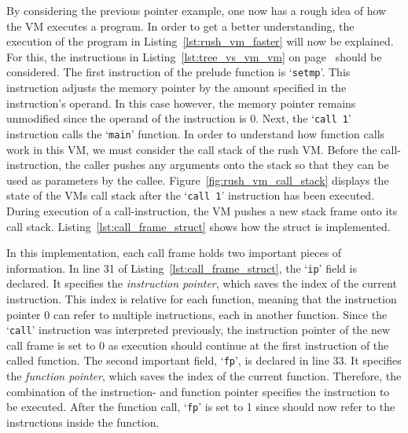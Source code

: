 By considering the previous pointer example, one now has a rough idea of how the VM executes a program.
In order to get a better understanding, the execution of the program in Listing~\ref{lst:rush_vm_faster} will now be explained.
For this, the instructions in Listing~\ref{lst:tree_vs_vm_vm} on page~\pageref{lst:tree_vs_vm_vm} should be considered.
The first instruction of the prelude function is `\texttt{setmp}'.
This instruction adjusts the memory pointer by the amount specified in the instruction's operand.
In this case however, the memory pointer remains unmodified since the operand of the instruction is 0.
Next, the `\texttt{call 1}' instruction calls the `\texttt{main}' function.
In order to understand how function calls work in this VM, we must consider the call stack of the rush VM\@.
Before the call-instruction, the caller pushes any arguments onto the stack so that they can be used as parameters by the callee.
Figure~\ref{fig:rush_vm_call_stack} displays the state of the VMs call stack after the `\texttt{call 1}' instruction has been executed.
During execution of a call-instruction, the VM pushes a new stack frame onto its call stack.
Listing~\ref{lst:call_frame_struct} shows how the  struct is implemented.


In this implementation, each call frame holds two important pieces of information.
In line 31 of Listing~\ref{lst:call_frame_struct}, the `\texttt{ip}' field is declared.
It specifies the \emph{instruction pointer}, which saves the index of the current instruction.
This index is relative for each function, meaning that the instruction pointer 0 can refer to multiple instructions,
each in another function.
Since the `\texttt{call}' instruction was interpreted previously, the instruction pointer of the new call frame is set to 0 as execution should continue at the first instruction of the called function.
The second important field, `\texttt{fp}', is declared in line 33.
It specifies the \emph{function pointer}, which saves the index of the current function.
Therefore, the combination of the instruction- and function pointer specifies the instruction to be executed.
After the function call, `\texttt{fp}' is set to 1 since  should now refer to the instructions inside the  function.

